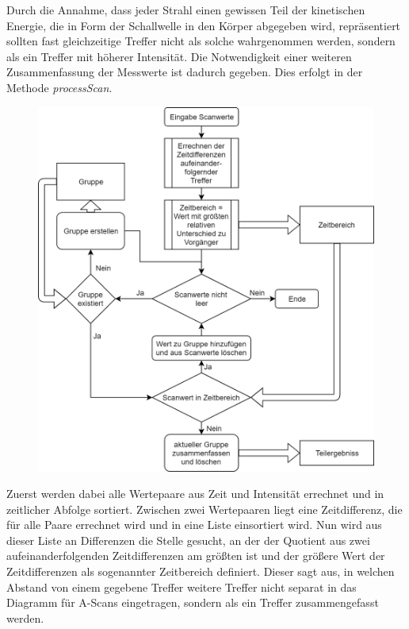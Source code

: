\documentclass[reducespace,stylepage,semiarbeit]{spezidoc}
\begin{document}
Durch die Annahme, dass jeder Strahl einen gewissen Teil der kinetischen Energie, die in Form der Schallwelle in den Körper abgegeben wird, repräsentiert sollten fast gleichzeitige Treffer nicht als solche wahrgenommen werden, sondern als ein Treffer mit höherer Intensität. %
Die Notwendigkeit einer weiteren Zusammenfassung der Messwerte ist dadurch gegeben. 
Dies erfolgt in der Methode \textsl{processScan}. \par %
\begin{figure}
\includegraphics[scale=0.3]{pictures/Flowchart_processScan.png}
\end{figure} 
Zuerst werden dabei alle Wertepaare aus Zeit und Intensität errechnet und in zeitlicher Abfolge sortiert. 
Zwischen zwei Wertepaaren liegt eine Zeitdifferenz, die für alle Paare errechnet wird und in eine Liste einsortiert wird.
Nun wird aus dieser Liste an Differenzen die Stelle gesucht, an der der Quotient aus zwei aufeinanderfolgenden Zeitdifferenzen am größten ist und der größere Wert der Zeitdifferenzen als sogenannter Zeitbereich definiert. 
Dieser sagt aus, in welchen Abstand von einem gegebene Treffer weitere Treffer nicht separat in das Diagramm für A-Scans eingetragen, sondern als ein Treffer zusammengefasst werden.\\
\end{document}
